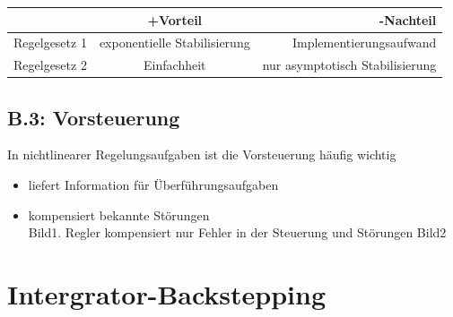 \documentclass[11pt,a4paper]{article}
\begin{document}
\begin{center}
  \begin{tabular}{ l | c | r }
     & +Vorteil & -Nachteil \\ \hline
    Regelgesetz 1 & exponentielle Stabilisierung & Implementierungsaufwand \\ \hline
   Regelgesetz 2 & Einfachheit & nur asymptotisch Stabilisierung \\
    \hline
  \end{tabular}
\end{center}
\subsection*{\textbf{B.3: } Vorsteuerung}
In nichtlinearer Regelungsaufgaben ist die Vorsteuerung häufig wichtig
\begin{itemize}
\item liefert Information für Überführungsaufgaben
\item kompensiert bekannte Störungen\\
Bild1. Regler kompensiert nur Fehler in der Steuerung und Störungen Bild2
\end{itemize}
\section{Intergrator-Backstepping}
\end{document}
